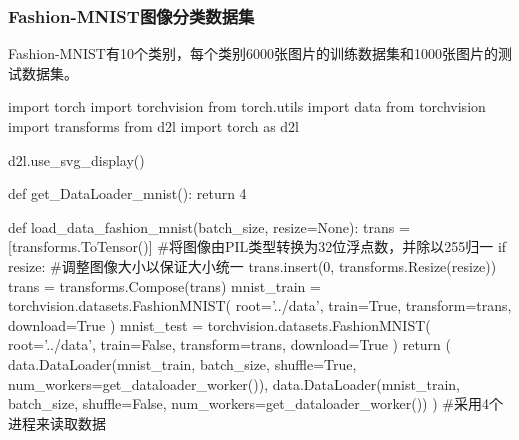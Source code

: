     \subsubsection{Fashion-MNIST图像分类数据集}
      Fashion-MNIST有10个类别，每个类别6000张图片的训练数据集和1000张图片的测试数据集。
      \begin{codeblock}[language = python, caption={Download Fashion-MNIST}]
        import torch
        import torchvision
        from torch.utils import data
        from torchvision import transforms
        from d2l import torch as d2l

        d2l.use_svg_display()

        def get_DataLoader_mnist():
            return 4

        def load_data_fashion_mnist(batch_size, resize=None):
            trans = [transforms.ToTensor()] #将图像由PIL类型转换为32位浮点数，并除以255归一
            if resize: #调整图像大小以保证大小统一
                trans.insert(0, transforms.Resize(resize))
            trans = transforms.Compose(trans)
            mnist_train = torchvision.datasets.FashionMNIST(
                root='../data', train=True, transform=trans, download=True
            )
            mnist_test = torchvision.datasets.FashionMNIST(
                root='../data', train=False, transform=trans, download=True
            )
            return (
                data.DataLoader(mnist_train, batch_size, shuffle=True, 
                                num_workers=get_dataloader_worker()),
                data.DataLoader(mnist_train, batch_size, shuffle=False, 
                                num_workers=get_dataloader_worker())
            ) #采用4个进程来读取数据
      \end{codeblock}

